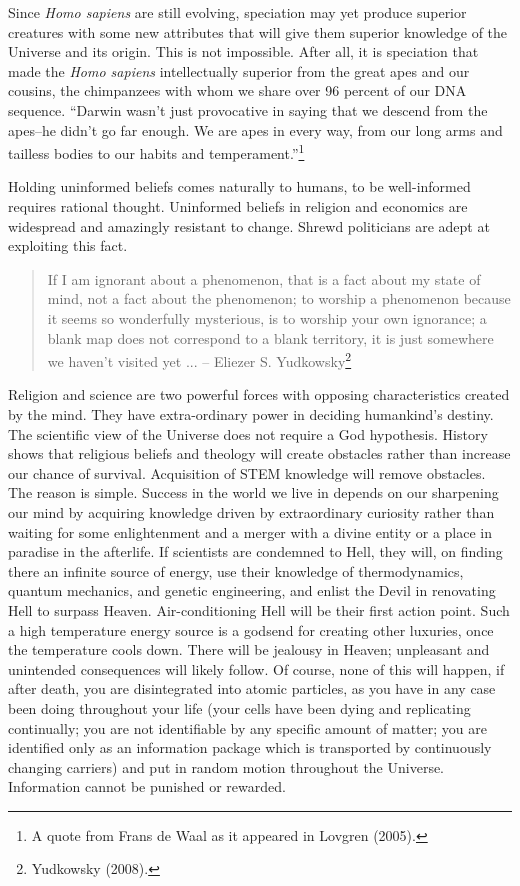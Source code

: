 \begin{multicols}{2}
Since \textit{Homo sapiens} are still evolving, speciation may yet produce superior creatures with some new attributes that will give them superior knowledge of the Universe and its origin. This is not impossible. After all, it is speciation that made the \textit{Homo sapiens} intellectually superior from the great apes and our cousins, the chimpanzees with whom we share over 96 percent of our DNA sequence. “Darwin wasn't just provocative in saying that we descend from the apes--he didn't go far enough. We are apes in every way, from our long arms and tailless bodies to our habits and temperament.”\footnote{A quote from Frans de Waal as it appeared in Lovgren (2005).}

Holding uninformed beliefs comes naturally to humans, to be well-informed requires rational thought. Uninformed beliefs in religion and economics are widespread and amazingly resistant to change. Shrewd politicians are adept at exploiting this fact.

\begin{quote}
If I am ignorant about a phenomenon, that is a fact about my state of mind, not a fact about the phenomenon; to worship a phenomenon because it seems so wonderfully mysterious, is to worship your own ignorance; a blank map does not correspond to a blank territory, it is just somewhere we haven't visited yet ... -- Eliezer S. Yudkowsky\footnote{Yudkowsky (2008).}
\end{quote}

Religion and science are two powerful forces with opposing characteristics created by the mind. They have extra-ordinary power in deciding humankind's destiny. The scientific view of the Universe does not require a God hypothesis. History shows that religious beliefs and theology will create obstacles rather than increase our chance of survival. Acquisition of STEM knowledge will remove obstacles. The reason is simple. Success in the world we live in depends on our sharpening our mind by acquiring knowledge driven by extraordinary curiosity rather than waiting for some enlightenment and a merger with a divine entity or a place in paradise in the afterlife. If scientists are condemned to Hell, they will, on finding there an infinite source of energy, use their knowledge of thermodynamics, quantum mechanics, and genetic engineering, and enlist the Devil in renovating Hell to surpass Heaven. Air-conditioning Hell will be their first action point. Such a high temperature energy source is a godsend for creating other luxuries, once the temperature cools down. There will be jealousy in Heaven; unpleasant and unintended consequences will likely follow. Of course, none of this will happen, if after death, you are disintegrated into atomic particles, as you have in any case been doing throughout your life (your cells have been dying and replicating continually; you are not identifiable by any specific amount of matter; you are identified only as an information package which is transported by continuously changing carriers) and put in random motion throughout the Universe. Information cannot be punished or rewarded.


\end{multicols}
